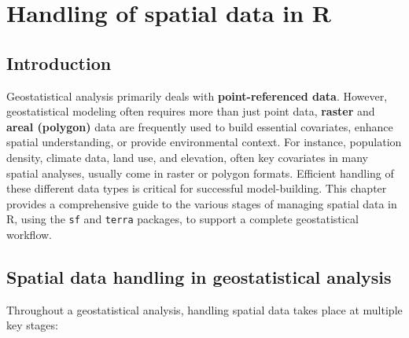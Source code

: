 \documentclass[
  letterpaper,
]{krantz}
\begin{document}

\chapter{Handling of spatial data in R}\label{sec-handling-data}

\section{Introduction}\label{introduction-1}

Geostatistical analysis primarily deals with \textbf{point-referenced
data}. However, geostatistical modeling often requires more than just
point data, \textbf{raster} and \textbf{areal (polygon)} data are
frequently used to build essential covariates, enhance spatial
understanding, or provide environmental context. For instance,
population density, climate data, land use, and elevation, often key
covariates in many spatial analyses, usually come in raster or polygon
formats. Efficient handling of these different data types is critical
for successful model-building. This chapter provides a comprehensive
guide to the various stages of managing spatial data in R, using the
\texttt{sf} and \texttt{terra} packages, to support a complete
geostatistical workflow.

\section{Spatial data handling in geostatistical
analysis}\label{spatial-data-handling-in-geostatistical-analysis}

Throughout a geostatistical analysis, handling spatial data takes place
at multiple key stages:
\end{document}
